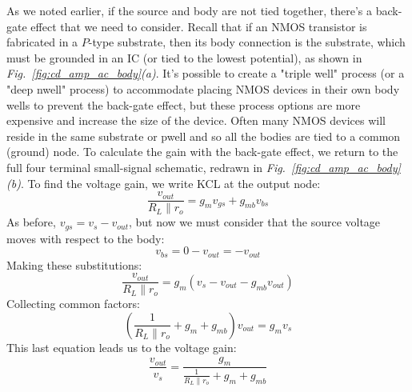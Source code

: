 As we noted earlier, if the source and body are not tied together, there's a back-gate effect that we need to consider.  Recall that if an NMOS transistor is fabricated in a $P$-type substrate, then its body connection is the substrate, which must be grounded in an IC (or tied to the lowest potential), as shown in \emph{Fig.~\ref{fig:cd_amp_ac_body}(a)}.  It's possible to create a "triple well" process (or a "deep nwell" process) to accommodate placing NMOS devices in their own body wells to prevent the back-gate effect, but these process options are more expensive and increase the size of the device.  Often many NMOS devices will reside in the same substrate or pwell and so all the bodies are tied to a common (ground) node.
To calculate the gain with the back-gate effect, we return to the full four terminal small-signal schematic, redrawn in \emph{Fig.~\ref{fig:cd_amp_ac_body}(b)}.  To find the voltage gain, we write KCL at the output node: 
    \begin{equation}
        \frac{{{v_{out}}}}{{{R_L} \parallel {r_o}}} = {g_m}{v_{gs}} + g_{mb} v_{bs} 
    \end{equation}
As before, $v_{gs} = v_{s} - v_{out}$, but now we must consider that the source voltage moves with respect to the body:
    \begin{equation}
        v_{bs} = 0 - v_{out} = -v_{out}
    \end{equation}
Making these substitutions:
    \begin{equation}
        \frac{{{v_{out}}}}{{{R_L} \parallel {r_o}}} = {g_m}\left( {{v_{s}} - {v_{out}}}  - g_{mb} v_{out} \right)
    \end{equation}
Collecting common factors:
    \begin{equation}
        \left( {\frac{1}{{{R_L} \parallel {r_o}}} + {g_m} + g_{mb} } \right){v_{out}} = {g_m}{v_{s}}
    \end{equation}
This last equation leads us to the voltage gain:
    \begin{equation}
        \frac{{{v_{out}}}}{{{v_{s}}}} = \frac{{{g_m}}}{{\frac{1}{{{R_L} \parallel {r_o}}} + {g_m} + g_{mb}}}
    \end{equation}
\newpage
